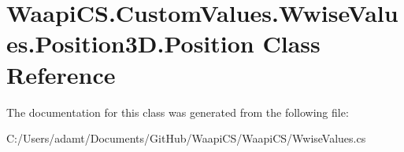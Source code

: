 \hypertarget{class_waapi_c_s_1_1_custom_values_1_1_wwise_values_1_1_position3_d_1_1_position}{}\section{Waapi\+C\+S.\+Custom\+Values.\+Wwise\+Values.\+Position3\+D.\+Position Class Reference}
\label{class_waapi_c_s_1_1_custom_values_1_1_wwise_values_1_1_position3_d_1_1_position}


The documentation for this class was generated from the following file\+:\begin{DoxyCompactItemize}
\item 
C\+:/\+Users/adamt/\+Documents/\+Git\+Hub/\+Waapi\+C\+S/\+Waapi\+C\+S/Wwise\+Values.\+cs\end{DoxyCompactItemize}
